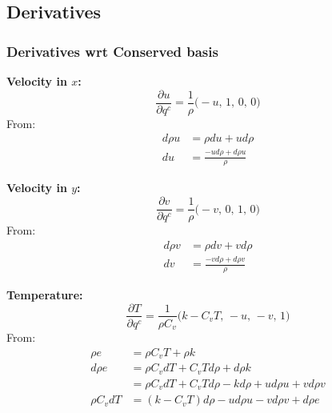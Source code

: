 \documentclass{article}
\begin{document}
\subsection{Derivatives}


\subsubsection{Derivatives wrt Conserved basis}

\textbf{Velocity in $x$:}
\begin{equation*}
    \frac{\partial u}{ \partial q^c} = \frac{1}{\rho}\big( -u,\, 1,\, 0,\, 0 \big)
\end{equation*}
From:
\begin{equation*}
    \begin{split}
        d\rho u & = \rho du + u d\rho \\
        du      & = \frac{-ud\rho + d\rho u}{\rho}
    \end{split}
\end{equation*}

\textbf{Velocity in $y$:}
\begin{equation*}
    \frac{\partial v}{ \partial q^c} = \frac{1}{\rho}\big( -v,\, 0,\, 1,\, 0 \big)
\end{equation*}
From:
\begin{equation*}
    \begin{split}
        d\rho v & = \rho dv + v d\rho \\
        dv      & = \frac{-vd\rho + d\rho v}{\rho}
    \end{split}
\end{equation*}

\textbf{Temperature:}
\begin{equation*}
    \frac{\partial T}{\partial q^c} = \frac{1}{\rho C_v}\big( k - C_v T,\, -u,\, -v,\, 1 \big)
\end{equation*}
From:
\begin{equation*}
    \begin{split}
        \rho e & = \rho C_v T + \rho k \\
       d\rho e & = \rho C_v dT + C_v T d\rho + d\rho k \\
               & = \rho C_v dT + C_v T d\rho - kd\rho + ud\rho u + vd\rho v \\
   \rho C_v dT & = (k - C_v T)d\rho - ud\rho u - vd\rho v + d\rho e
    \end{split}
\end{equation*}
\end{document}
